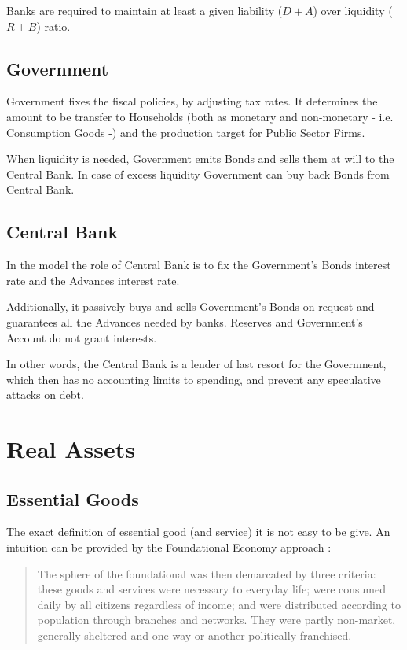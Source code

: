 \documentclass[a4paper, headings=standardclasses]{scrartcl}
\begin{document}
Banks are required to maintain at least a given liability ($D+A$) over liquidity ($R+B$) ratio.

\subsection{Government}
Government fixes the fiscal policies, by adjusting tax rates. It determines the amount to be transfer to Households (both as monetary and non-monetary - i.e. Consumption Goods -) and the production target for Public Sector Firms.

When liquidity is needed, Government emits Bonds and sells them at will to the Central Bank. In case of excess liquidity Government can buy back Bonds from Central Bank.

\subsection{Central Bank}
In the model the role of Central Bank is to fix the Government's Bonds interest rate and the Advances interest rate.

Additionally, it passively buys and sells Government's Bonds on request and guarantees all the Advances needed by banks. Reserves and Government's Account do not grant interests.

In other words, the Central Bank is a lender of last resort for the Government, which then has no accounting limits to spending, and prevent any speculative attacks on debt.

\section{Real Assets}
\subsection{Essential Goods}
The exact definition of essential good (and service) it is not easy to be give. An intuition can be provided by the Foundational Economy approach \parencite{arcidiacono2018a}: \begin{quote}
	The sphere of the foundational was then demarcated by three criteria: these goods and services were necessary to everyday life; were consumed daily by all citizens regardless of income; and were distributed according to population through branches and networks. They were partly non-market, generally sheltered and one way or another politically franchised.
\end{quote}
\end{document}
